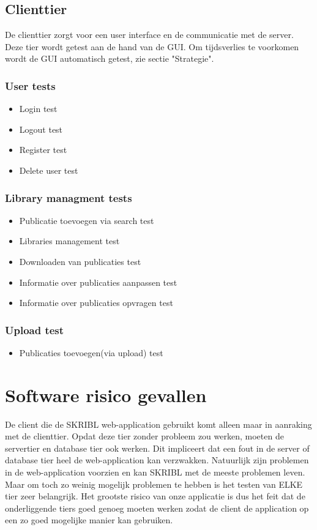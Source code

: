 \documentclass{article}
\begin{document}
\subsection{Clienttier}
De clienttier zorgt voor een user interface en de communicatie met de server. Deze tier wordt getest aan de hand van de GUI. Om tijdsverlies te voorkomen wordt de GUI automatisch getest, zie sectie "Strategie".
\subsubsection{User tests}
\begin{itemize}
  \item Login test
  \item Logout test 
  \item Register test
  \item Delete user test
\end{itemize}
\subsubsection{Library managment tests}
\begin{itemize}
  \item Publicatie toevoegen via search test
  \item Libraries management test
  \item Downloaden van publicaties test
  \item Informatie over publicaties aanpassen test
  \item Informatie over publicaties opvragen test
\end{itemize}
\subsubsection{Upload test}
\begin{itemize}
  \item Publicaties toevoegen(via upload) test
\end{itemize}
\section{Software risico gevallen}
De client die de SKRIBL web-application gebruikt komt alleen maar in aanraking met de clienttier. Opdat deze tier zonder probleem zou werken, moeten de servertier en database tier ook werken. Dit impliceert dat een fout in de server of database tier heel de web-application kan verzwakken. Natuurlijk zijn problemen in de web-application voorzien en kan SKRIBL met de meeste problemen leven. Maar om toch zo weinig mogelijk problemen te hebben is het testen  van ELKE tier zeer belangrijk. Het grootste risico van onze applicatie is dus het feit dat de onderliggende tiers goed genoeg moeten werken zodat de client de application op een zo goed mogelijke manier kan gebruiken.
%
\end{document}

